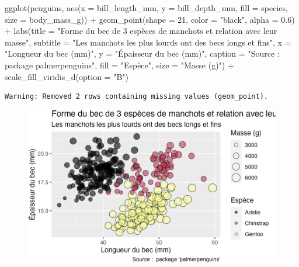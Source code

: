 \documentclass[
  letterpaper,
  DIV=11,
  numbers=noendperiod]{scrreprt}
\newenvironment{Shaded}{\begin{snugshade}}{\end{snugshade}}
\newcommand{\AttributeTok}[1]{\textcolor[rgb]{0.40,0.45,0.13}{#1}}
\newcommand{\DecValTok}[1]{\textcolor[rgb]{0.68,0.00,0.00}{#1}}
\newcommand{\FloatTok}[1]{\textcolor[rgb]{0.68,0.00,0.00}{#1}}
\newcommand{\FunctionTok}[1]{\textcolor[rgb]{0.28,0.35,0.67}{#1}}
\newcommand{\NormalTok}[1]{\textcolor[rgb]{0.00,0.23,0.31}{#1}}
\newcommand{\SpecialCharTok}[1]{\textcolor[rgb]{0.37,0.37,0.37}{#1}}
\newcommand{\StringTok}[1]{\textcolor[rgb]{0.13,0.47,0.30}{#1}}
\begin{document}
\begin{Shaded}
\begin{Highlighting}[]
\FunctionTok{ggplot}\NormalTok{(penguins, }\FunctionTok{aes}\NormalTok{(}\AttributeTok{x =}\NormalTok{ bill\_length\_mm, }\AttributeTok{y =}\NormalTok{ bill\_depth\_mm,}
                     \AttributeTok{fill =}\NormalTok{ species, }\AttributeTok{size =}\NormalTok{ body\_mass\_g)) }\SpecialCharTok{+}
  \FunctionTok{geom\_point}\NormalTok{(}\AttributeTok{shape =} \DecValTok{21}\NormalTok{, }\AttributeTok{color =} \StringTok{"black"}\NormalTok{, }\AttributeTok{alpha =} \FloatTok{0.6}\NormalTok{) }\SpecialCharTok{+}
  \FunctionTok{labs}\NormalTok{(}\AttributeTok{title =} \StringTok{"Forme du bec de 3 espèces de manchots et relation avec leur masse"}\NormalTok{,}
       \AttributeTok{subtitle =} \StringTok{"Les manchots les plus lourds ont des becs longs et fins"}\NormalTok{,}
       \AttributeTok{x =} \StringTok{"Longueur du bec (mm)"}\NormalTok{,}
       \AttributeTok{y =} \StringTok{"Épaisseur du bec (mm)"}\NormalTok{,}
       \AttributeTok{caption =} \StringTok{"Source :  package \textquotesingle{}palmerpenguins\textquotesingle{}"}\NormalTok{,}
       \AttributeTok{fill =} \StringTok{"Espèce"}\NormalTok{,}
       \AttributeTok{size =} \StringTok{"Masse (g)"}\NormalTok{) }\SpecialCharTok{+}
  \FunctionTok{scale\_fill\_viridis\_d}\NormalTok{(}\AttributeTok{option =} \StringTok{"B"}\NormalTok{)}
\end{Highlighting}
\end{Shaded}

\begin{verbatim}
Warning: Removed 2 rows containing missing values (geom_point).
\end{verbatim}

\begin{figure}[H]

{\centering \includegraphics{./03-visualization_files/figure-pdf/unnamed-chunk-108-1.png}

}

\end{figure}
\end{document}
